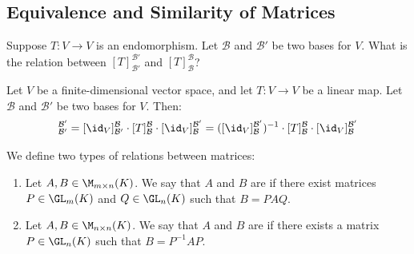 \subsection{Equivalence and Similarity of Matrices}

\begin{question}
Suppose $T: V \to V$ is an endomorphism. Let $\mathcal{B}$ and $\mathcal{B}'$ be two bases for $V$. What is the relation between $[T]_{\mathcal{B}'}^{\mathcal{B}'}$ and $[T]_{\mathcal{B}}^{\mathcal{B}}$?
\end{question}

\begin{corollary}
\label{cor:similarity_of_representation_matrices}
Let $V$ be a finite-di\-men\-sional vector space, and let $T: V \to V$ be a linear map. Let $\mathcal{B}$ and $\mathcal{B}'$ be two bases for $V$. Then:
\begin{equation*}
    [T]_{\mathcal{B}'}^{\mathcal{B}'} = [\id_V]_{\mathcal{B}'}^{\mathcal{B}} \cdot [T]_{\mathcal{B}}^{\mathcal{B}} \cdot [\id_V]_{\mathcal{B}}^{\mathcal{B}'} = ([\id_V]_{\mathcal{B}}^{\mathcal{B}'})^{-1} \cdot [T]_{\mathcal{B}}^{\mathcal{B}} \cdot [\id_V]_{\mathcal{B}}^{\mathcal{B}'}
\end{equation*}
\end{corollary}

\begin{definition}
\label{def:equivalence_and_similarity}
We define two types of relations between matrices:
\begin{enumerate}
    \item Let $A, B \in \M_{m \times n}(K)$. We say that $A$ and $B$ are  if there exist matrices $P \in \GL_m(K)$ and $Q \in \GL_n(K)$ such that $B = P A Q$.
    \item Let $A, B \in \M_{n \times n}(K)$. We say that $A$ and $B$ are  if there exists a matrix $P \in \GL_n(K)$ such that $B = P^{-1} A P$.
\end{enumerate}
\end{definition}

